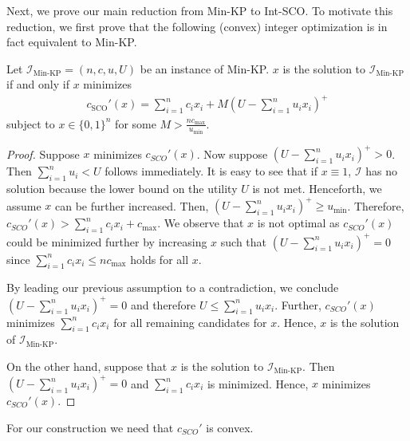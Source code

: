 Next, we prove our main reduction from Min-KP to Int-SCO. To motivate this reduction, we first prove that the following (convex) integer optimization is in fact equivalent to Min-KP.

\begin{lemma}
\label{lemma:integer_minimization}
Let $\mathcal{I}_{\text{Min-KP}} = (n, c, u, U)$ be an instance of Min-KP. $x$ is the solution to $\mathcal{I}_{\text{Min-KP}}$ if and only if $x$ minimizes \begin{align*}
    c_{\text{SCO}}'(x) = \sum_{i=1}^n c_i x_i + M\left(U - \sum_{i=1}^n u_i x_i\right)^+
\end{align*} subject to $x \in \{0,1\}^n$ for some $M > \frac{n c_{\text{max}}}{u_{\text{min}}}$.
\end{lemma}
\begin{proof}
Suppose $x$ minimizes $c_{SCO}'(x)$. Now suppose $(U - \sum_{i=1}^n u_i x_i)^+ > 0$. Then $\sum_{i=1}^n u_i < U$ follows immediately. It is easy to see that if $x \equiv 1$, $\mathcal{I}$ has no solution because the lower bound on the utility $U$ is not met. Henceforth, we assume $x$ can be further increased. Then, $(U - \sum_{i=1}^n u_i x_i)^+ \geq u_{\text{min}}$. Therefore, $c_{SCO}'(x) > \sum_{i=1}^n c_i x_i + c_{\text{max}}$. We observe that $x$ is not optimal as $c_{SCO}'(x)$ could be minimized further by increasing $x$ such that $(U - \sum_{i=1}^n u_i x_i)^+ = 0$ since $\sum_{i=1}^n c_i x_i \leq n c_{\text{max}}$ holds for all $x$.

By leading our previous assumption to a contradiction, we conclude $(U - \sum_{i=1}^n u_i x_i)^+ = 0$ and therefore $U \leq \sum_{i=1}^n u_i x_i$. Further, $c_{SCO}'(x)$ minimizes $\sum_{i=1}^n c_i x_i$ for all remaining candidates for $x$. Hence, $x$ is the solution of $\mathcal{I}_{\text{Min-KP}}$.

On the other hand, suppose that $x$ is the solution to $\mathcal{I}_{\text{Min-KP}}$. Then $(U - \sum_{i=1}^n u_i x_i)^+ = 0$ and $\sum_{i=1}^n c_i x_i$ is minimized. Hence, $x$ minimizes $c_{SCO}'(x)$.
\end{proof}

For our construction we need that $c_{SCO}'$ is convex.

